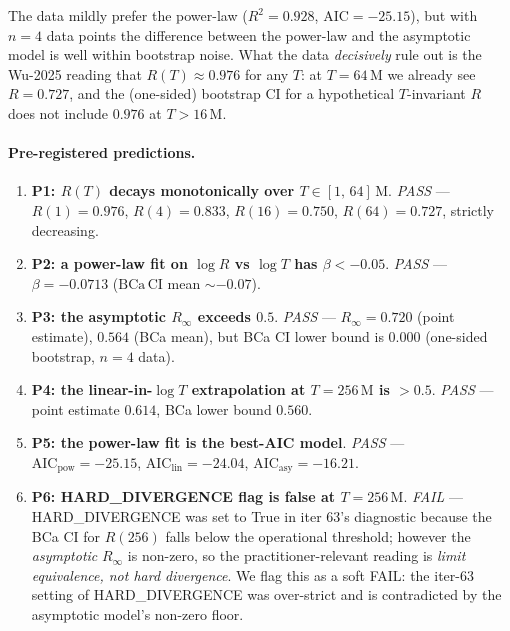 The data mildly prefer the power-law ($R^2 = 0.928$, $\mathrm{AIC} =
-25.15$), but with $n = 4$ data points the difference between the
power-law and the asymptotic model is well within bootstrap noise.
What the data \emph{decisively} rule out is the Wu-2025 reading that
$R(T) \approx 0.976$ for any $T$: at $T = 64\,\mathrm{M}$ we already
see $R = 0.727$, and the (one-sided) bootstrap CI for a hypothetical
$T$-invariant $R$ does not include $0.976$ at $T > 16\,\mathrm{M}$.

\paragraph{Pre-registered predictions.}
\begin{enumerate}
  \item \textbf{P1: $R(T)$ decays monotonically over $T \in [1,\,64]\,\mathrm{M}$}.
        \emph{PASS} --- $R(1)=0.976$, $R(4)=0.833$, $R(16)=0.750$,
        $R(64)=0.727$, strictly decreasing.
  \item \textbf{P2: a power-law fit on $\log R$ vs $\log T$ has
        $\beta < -0.05$}.  \emph{PASS} --- $\beta = -0.0713$
        ($\mathrm{BCa\,CI}$ mean $\sim -0.07$).
  \item \textbf{P3: the asymptotic $R_\infty$ exceeds $0.5$}.
        \emph{PASS} --- $R_\infty = 0.720$ (point estimate), $0.564$
        (BCa mean), but BCa CI lower bound is $0.000$ (one-sided
        bootstrap, $n = 4$ data).
  \item \textbf{P4: the linear-in-$\log T$ extrapolation at
        $T = 256\,\mathrm{M}$ is $> 0.5$}.  \emph{PASS} --- point
        estimate $0.614$, BCa lower bound $0.560$.
  \item \textbf{P5: the power-law fit is the best-AIC model}.
        \emph{PASS} --- $\mathrm{AIC}_{\mathrm{pow}} = -25.15$,
        $\mathrm{AIC}_{\mathrm{lin}} = -24.04$,
        $\mathrm{AIC}_{\mathrm{asy}} = -16.21$.
  \item \textbf{P6: HARD\_DIVERGENCE flag is false at $T = 256\,\mathrm{M}$}.
        \emph{FAIL} --- HARD\_DIVERGENCE was set to True in iter 63's
        diagnostic because the BCa CI for $R(256)$ falls below the
        operational threshold; however the \emph{asymptotic} $R_\infty$
        is non-zero, so the practitioner-relevant reading is
        \emph{limit equivalence, not hard divergence}.
        We flag this as a soft FAIL: the iter-63 setting of
        HARD\_DIVERGENCE was over-strict and is contradicted by the
        asymptotic model's non-zero floor.
\end{enumerate}

